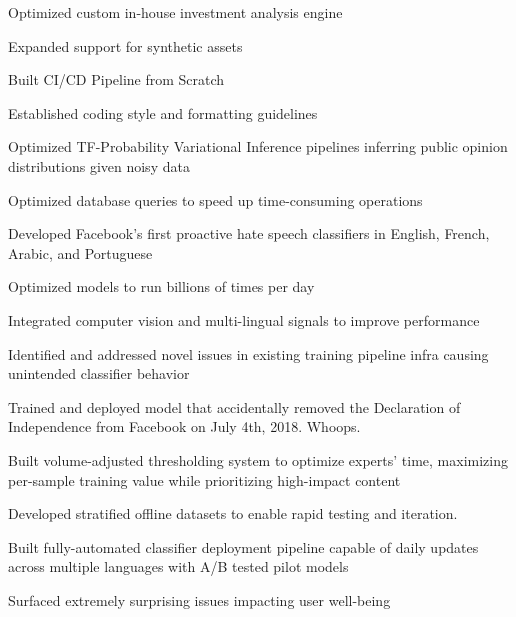 \documentclass[]{resume}
\begin{document}
\begin{minipage}[t]{1.0\textwidth}
\begin{tightemize}
    \item Optimized custom in-house investment analysis engine
    \item Expanded support for synthetic assets 
    \columnbreak
    \item Built CI/CD Pipeline from Scratch
    \item Established coding style and formatting guidelines
\end{tightemize}


\begin{tightemize}
    \item Optimized TF-Probability Variational Inference pipelines inferring public opinion distributions given noisy data
    \item Optimized database queries to speed up time-consuming operations
    
\end{tightemize}

\begin{tightemize}
\item Developed Facebook's first proactive hate speech classifiers in English, French, Arabic, and Portuguese
\item Optimized models to run billions of times per day
\item Integrated computer vision and multi-lingual signals to improve performance
\item Identified and addressed novel issues in existing training pipeline infra causing unintended classifier behavior
\item Trained and deployed model that accidentally removed the Declaration of Independence from Facebook on July 4th, 2018. Whoops.

\columnbreak

\item Built volume-adjusted thresholding system to optimize experts' time, maximizing per-sample training value while prioritizing high-impact content
\item Developed stratified offline datasets to enable rapid testing and iteration.
\item Built fully-automated classifier deployment pipeline capable of daily updates 
across multiple languages with A/B tested pilot models
\item Surfaced extremely surprising issues impacting user well-being
\end{tightemize}


\end{minipage}
\end{document}
